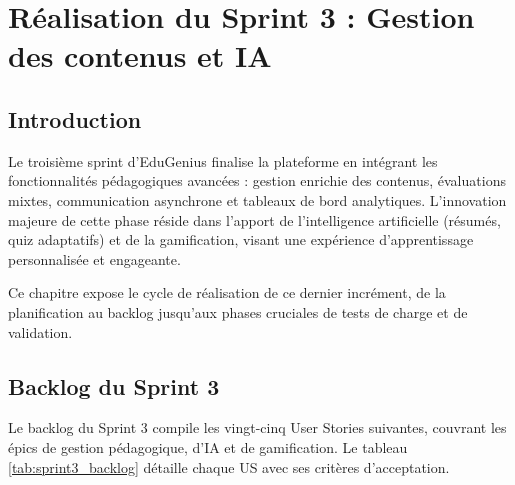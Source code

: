 \chapter{Réalisation du Sprint 3 : Gestion des contenus et IA}

\section*{Introduction}

Le troisième sprint d'EduGenius finalise la plateforme en intégrant les fonctionnalités pédagogiques avancées : gestion enrichie des contenus, évaluations mixtes, communication asynchrone et tableaux de bord analytiques. L'innovation majeure de cette phase réside dans l'apport de l'intelligence artificielle (résumés, quiz adaptatifs) et de la gamification, visant une expérience d'apprentissage personnalisée et engageante.

Ce chapitre expose le cycle de réalisation de ce dernier incrément, de la planification au backlog jusqu'aux phases cruciales de tests de charge et de validation.

\section{Backlog du Sprint 3}

Le backlog du Sprint 3 compile les vingt-cinq User Stories suivantes, couvrant les épics de gestion pédagogique, d'IA et de gamification. Le tableau \ref{tab:sprint3_backlog} détaille chaque US avec ses critères d’acceptation.

